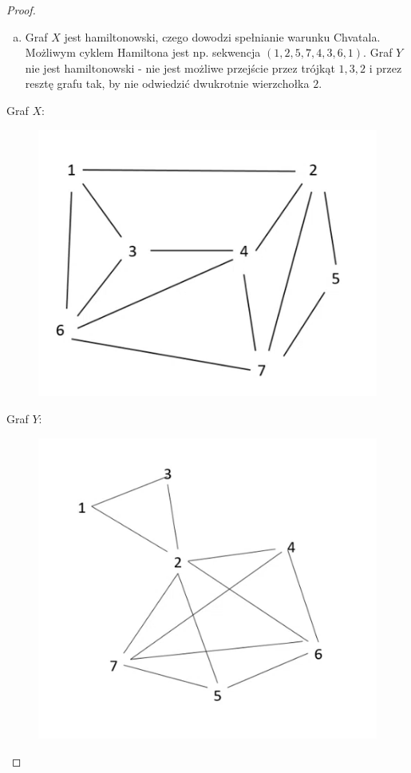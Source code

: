 \documentclass[11pt]{article}
\theoremstyle{definition}
\begin{document}
\begin{proof}
\begin{enumerate}[a)]
        \item Graf $X$ jest hamiltonowski, czego dowodzi spełnianie warunku Chvatala. Możliwym cyklem Hamiltona jest np. sekwencja $(1,2,5,7,4,3,6,1)$. Graf $Y$ nie jest hamiltonowski - nie jest możliwe przejście przez trójkąt $1,3,2$ i przez resztę grafu tak, by nie odwiedzić dwukrotnie wierzchołka $2$.
    \end{enumerate}


    \begin{minipage}{0.4\linewidth}
        Graf $X$:
        \begin{figure}[H]
            \raggedright
            \includegraphics[width=1\linewidth]{./data/graf_x.png}
        \end{figure}
    \end{minipage}\begin{minipage}{0.4\linewidth}
        Graf $Y$:
        \begin{figure}[H]
            \raggedright
            \includegraphics[width=1\linewidth]{./data/graf_y.png}
        \end{figure}
    \end{minipage}
\end{proof}
\end{document}
